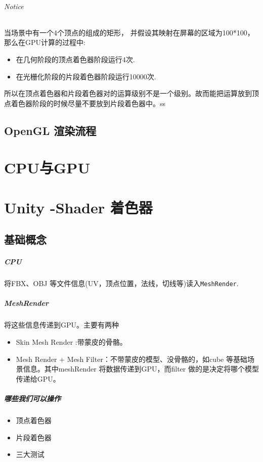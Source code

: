 \documentclass[UTF8,a4paper,12pt]{ctexbook}
\begin{document}
	
			\subparagraph{Notice}
				当场景中有一个4个顶点的组成的矩形， 并假设其映射在屏幕的区域为100*100，那么在GPU计算的过程中:
				\begin{itemize}
					\item 在几何阶段的顶点着色器阶段运行4次.
					\item 在光栅化阶段的片段着色器阶段运行10000次.	
				\end{itemize}
				
				所以在顶点着色器和片段着色器对的运算级别不是一个级别。故而能把运算放到顶点着色器阶段的时候尽量不要放到片段着色器中。ss
				
	\section{OpenGL 渲染流程}
			
		
\chapter{CPU与GPU}
	


\chapter{Unity -Shader 着色器}
	\section{基础概念}
		\paragraph{CPU} 将FBX、OBJ 等文件信息(UV，顶点位置，法线，切线等)读入\verb|MeshRender|.
		
		\paragraph{MeshRender} 将这些信息传递到GPU。主要有两种
			\begin{itemize}
				\item Skin Mesh Render :带蒙皮的骨骼。
				\item Mesh Render + Mesh Filter：不带蒙皮的模型、没骨骼的，如cube 等基础场景信息。其中meshRender 将数据传递到GPU，而filter 做的是决定将哪个模型传递给GPU。
			\end{itemize}
		
		\paragraph{哪些我们可以操作}
			\begin{itemize}
				\item 顶点着色器
				\item 片段着色器
				\item 三大测试
			\end{itemize}
	
\end{document}
